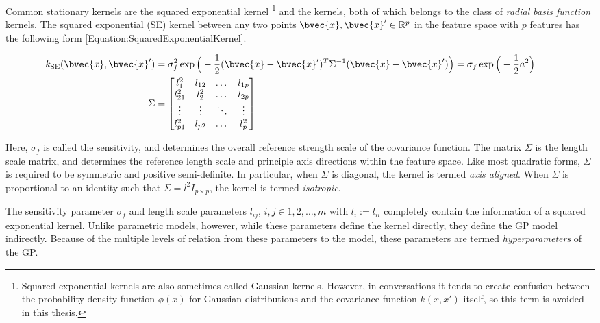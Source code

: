 				Common stationary kernels are the squared exponential kernel \footnote{Squared exponential kernels are also sometimes called Gaussian kernels. However, in conversations it tends to create confusion between the probability density function $\phi(x)$ for Gaussian distributions and the covariance function $k(x, x')$ itself, so this term is avoided in this thesis.} and the \matern kernels, both of which belongs to the class of \textit{radial basis function} kernels. The squared exponential (SE) kernel between any two points $\bvec{x}, \bvec{x}' \in \mathbb{R}^{p}$ in the feature space with $p$ features has the following form \eqref{Equation:SquaredExponentialKernel}.
				
				\begin{equation}
					\left.
						\begin{aligned}
							k_{\mathrm{SE}}(\bvec{x}, \bvec{x}') &= \sigma_{f}^{2} \exp\Big(-\frac{1}{2}(\bvec{x} - \bvec{x}')^{T} \Sigma^{-1} (\bvec{x} - \bvec{x}')\Big) = \sigma_{f} \exp\Big(-\frac{1}{2} a^{2} \Big) \\
							\Sigma &= 	\begin{bmatrix}
											l_{1}^{2} & l_{12} & \dots & l_{1p} \\
											l_{21}^{2} & l_{2}^{2} & \dots & l_{2p} \\
											\vdots & \vdots  & \ddots & \vdots \\
											l_{p1}^{2} & l_{p2} & \dots & l_{p}^{2} \\
									  	\end{bmatrix}
						\end{aligned}
					\qquad \right.
				\label{Equation:SquaredExponentialKernel}
				\end{equation}
				
				Here, $\sigma_{f}$ is called the sensitivity, and determines the overall reference strength scale of the covariance function. The matrix $\Sigma$ is the length scale matrix, and determines the reference length scale and principle axis directions within the feature space. Like most quadratic forms, $\Sigma$ is required to be symmetric and positive semi-definite. In particular, when $\Sigma$ is diagonal, the kernel is termed \textit{axis aligned}. When $\Sigma$ is proportional to an identity such that $\Sigma = l^{2} I_{p \times p}$, the kernel is termed \textit{isotropic}.
				
				The sensitivity parameter $\sigma_{f}$ and length scale parameters $l_{ij}$, $i, j \in {1, 2, \dots, m}$ with $l_{i} := l_{ii}$ completely contain the information of a squared exponential kernel. Unlike parametric models, however, while these parameters define the kernel directly, they define the GP model indirectly. Because of the multiple levels of relation from these parameters to the model, these parameters are termed \textit{hyperparameters} of the GP.
				
